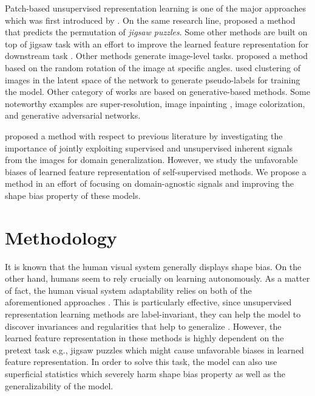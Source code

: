 \documentclass[10pt,twocolumn,letterpaper]{article}
\begin{document}
Patch-based unsupervised representation learning is one of the major approaches which was first introduced by \cite{doersch2015unsupervised}.
On the same research line, \cite{noroozi2016unsupervised} proposed a method that predicts the permutation of \textit{jigsaw puzzles}. Some other methods are built on top of jigsaw task with an effort to improve the learned feature representation for downstream task \cite{noroozi2018boosting, kim2018learning}.
Other methods generate image-level tasks. \cite{gidaris2018unsupervised} proposed a method based on the random rotation of the image at specific angles.
\cite{caron2018deep} used clustering of images in the latent space of the network to generate pseudo-labels for training the model.
Other category of works are based on generative-based methods. Some noteworthy examples are super-resolution\cite{ledig2017photo}, image inpainting \cite{pathak2016context}, image colorization\cite{zhang2016colorful}, and generative adversarial networks\cite{zhu2017unpaired}.

\cite{carlucci2019domain} proposed a method with respect to previous literature by investigating the importance of jointly exploiting supervised
and unsupervised inherent signals from the images for domain generalization. However, we study the unfavorable biases of learned feature representation of self-supervised methods. We propose a method in an effort of focusing on domain-agnostic signals and improving the shape bias property of these models. 
 \section{Methodology}
It is known that the human visual system generally displays shape bias.
On the other hand, humans seem to rely crucially on learning autonomously. As a matter of fact, the human visual system adaptability relies on both of the aforementioned approaches \cite{ritter2017cognitive, geirhos2018generalisation}.
This is particularly effective, since unsupervised representation learning methods are label-invariant, they can help the model to discover invariances and regularities that help to generalize \cite{carlucci2019domain}.
However, the learned feature representation in these methods is highly dependent on the pretext task e.g., jigsaw puzzles which might cause unfavorable biases in learned feature representation. In order to solve this task, the model can also use superficial statistics which severely harm shape bias property as well as the generalizability of the model.
\end{document}

